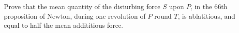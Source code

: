 Prove that the mean quantity of the disturbing force $S$
upon $P$, in the 66th proposition of Newton, during one 
revolution of $P$ round $T$, is ablatitious, and equal to
half the mean addititious force.

